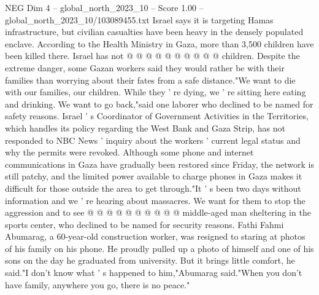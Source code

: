 \begin{textsample}{NEG Dim 4 – global\_north\_2023\_10 – Score 1.00 – global\_north\_2023\_10/103089455.txt}
Israel says it is targeting Hamas infrastructure, but civilian casualties have been heavy in the densely populated enclave.
According to the Health Ministry in Gaza, more than 3,500 children have been killed there.
Israel has not @ @ @ @ @ @ @ @ @ @ children.
Despite the extreme danger, some Gazan workers said they would rather be with their families than worrying about their fates from a safe distance."We want to die with our families, our children.
While they ' re dying, we ' re sitting here eating and drinking.
We want to go back,"said one laborer who declined to be named for safety reasons.
Israel ' s Coordinator of Government Activities in the Territories, which handles its policy regarding the West Bank and Gaza Strip, has not responded to NBC News ' inquiry about the workers ' current legal status and why the permits were revoked.
Although some phone and internet communications in Gaza have gradually been restored since Friday, the network is still patchy, and the limited power available to charge phones in Gaza makes it difficult for those outside the area to get through."It ' s been two days without information and we ' re hearing about massacres.
We want for them to stop the aggression and to see @ @ @ @ @ @ @ @ @ @ middle-aged man sheltering in the sports center, who declined to be named for security reasons.
Fathi Fahmi Abumarag, a 60-year-old construction worker, was resigned to staring at photos of his family on his phone.
He proudly pulled up a photo of himself and one of his sons on the day he graduated from university.
But it brings little comfort, he said."I don't know what ' s happened to him,"Abumarag said."When you don't have family, anywhere you go, there is no peace."

\end{textsample}
